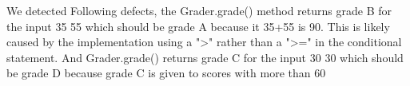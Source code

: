 \begin{parlist}
\item We detected Following defects, the Grader.grade() method returns grade B for the input 35 55 which should be grade
A because it 35+55 is 90. This is likely caused by the implementation using a ">" rather than a ">=" in the conditional statement. And Grader.grade() returns grade C for the input 30 30 which should be grade
D because grade C is given to scores with more than 60%

\end{parlist}

